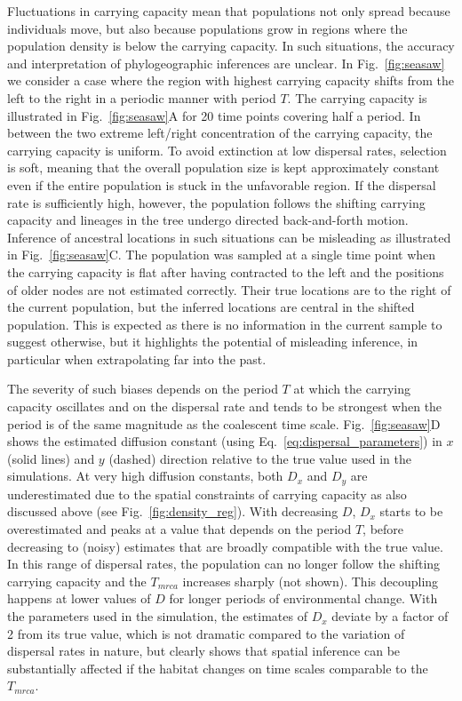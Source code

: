 \documentclass[aps,rmp, twocolumn]{revtex4}
\begin{document}
Fluctuations in carrying capacity mean that populations not only spread because individuals move, but also because populations grow in regions where the population density is below the carrying capacity.
In such situations, the accuracy and interpretation of phylogeographic inferences are unclear.
In Fig.~\ref{fig:seasaw} we consider a case where the region with highest carrying capacity shifts from the left to the right in a periodic manner with period $T$.
The carrying capacity is illustrated in Fig.~\ref{fig:seasaw}A for 20 time points covering half a period.
In between the two extreme left/right concentration of the carrying capacity, the carrying capacity is uniform.
To avoid extinction at low dispersal rates, selection is soft, meaning that the overall population size is kept approximately constant even if the entire population is stuck in the unfavorable region.
If the dispersal rate is sufficiently high, however, the population follows the shifting carrying capacity and lineages in the tree undergo directed back-and-forth motion.
Inference of ancestral locations in such situations can be misleading as illustrated in Fig.~\ref{fig:seasaw}C.
The population was sampled at a single time point when the carrying capacity is flat after having contracted to the left and the positions of older nodes are not estimated correctly.
Their true locations are to the right of the current population, but the inferred locations are central in the shifted population.
This is expected as there is no information in the current sample to suggest otherwise, but it highlights the potential of misleading inference, in particular when extrapolating far into the past.

The severity of such biases depends on the period $T$ at which the carrying capacity oscillates and on the dispersal rate and tends to be strongest when the period is of the same magnitude as the coalescent time scale.
Fig.~\ref{fig:seasaw}D shows the estimated diffusion constant (using Eq.~\ref{eq:dispersal_parameters}) in $x$ (solid lines) and $y$ (dashed) direction relative to the true value used in the simulations.
At very high diffusion constants, both $D_x$ and $D_y$ are underestimated due to the spatial constraints of carrying capacity as also discussed above (see Fig.~\ref{fig:density_reg}).
With decreasing $D$, $D_x$ starts to be overestimated and peaks at a value that depends on the period $T$, before decreasing to (noisy) estimates that are broadly compatible with the true value.
In this range of dispersal rates, the population can no longer follow the shifting carrying capacity and the $T_{mrca}$ increases sharply (not shown).
This decoupling happens at lower values of $D$ for longer periods of environmental change.
With the parameters used in the simulation, the estimates of $D_x$ deviate by a factor of 2 from its true value, which is not dramatic compared to the variation of dispersal rates in nature, but clearly shows that spatial inference can be substantially affected if the habitat changes on time scales comparable to the $T_{mrca}$.
\end{document}
